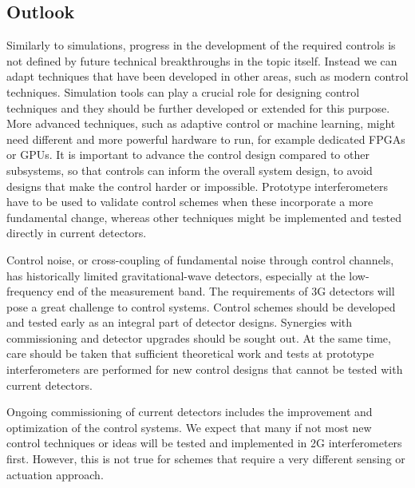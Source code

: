 \subsection{Outlook}
Similarly to simulations, progress in the development of the required controls is not defined by future technical breakthroughs in the topic itself. 
Instead we can adapt techniques that have been developed in other areas, such as modern control techniques. Simulation tools can play a crucial role for designing control techniques and they should be further developed or extended for this purpose.
More advanced techniques, such as adaptive control or machine learning, might need different and more powerful hardware to run, for example dedicated FPGAs or GPUs. 
It is important to advance the control design compared to other subsystems, so that controls can inform the overall system design, 
to avoid designs that make the control harder or impossible. Prototype interferometers have to be used
to validate control schemes when these incorporate a more fundamental change, whereas other techniques might be implemented and tested directly in current detectors.

Control noise, or cross-coupling of fundamental noise through control channels, has historically limited gravitational-wave detectors, especially at the low-frequency end of the measurement band. 
The requirements of 3G detectors will pose a great challenge to control systems. Control schemes should be developed and tested early as an integral part of detector designs. Synergies with commissioning and detector upgrades should be sought out. 
At the same time, care should be taken that sufficient theoretical work and tests at prototype interferometers are performed for new control designs that cannot be tested with current detectors.

Ongoing commissioning of current detectors includes the improvement and optimization of the control systems. We expect that many if not most new control techniques or ideas will be tested and implemented in 2G interferometers first. However, this is not true for schemes that require a very different sensing or actuation approach.
